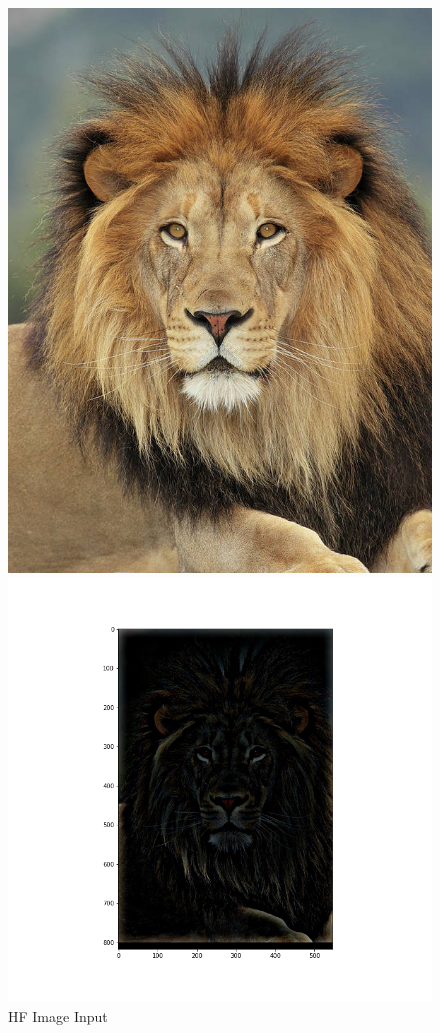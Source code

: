 \documentclass{article}
\begin{document}
\begin{figure}[!htb]
    \includegraphics[width=\linewidth]{lion.jpeg}
    \caption{HF Image Input}\label{fig:awesome_image1}
\endminipage
{}
    \includegraphics[width=\linewidth]{high lion.png}

\end{figure}
\end{document}
